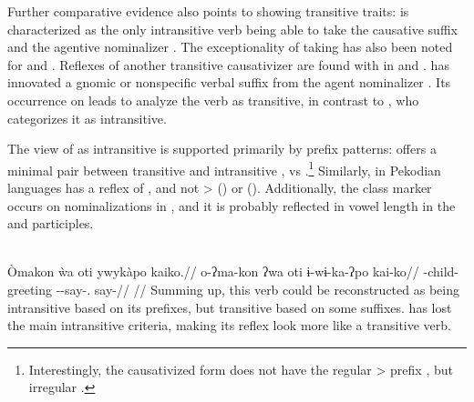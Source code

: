 Further comparative evidence also points to   showing transitive traits:
\trio {} is characterized as the only intransitive verb being able to take the causative suffix  and the agentive nominalizer  \parencite[263, 169]{triomeira1999}.
The exceptionality of   taking   has also been noted for \kalina \parencite[82]{courtz2008carib} and \wayana \parencite[258]{wayanatavares2005}.
Reflexes of another transitive causativizer  \parencite{gildea2015valency} are found with  in \apalai \parencite[51]{koehn1986apalai} and \waiwai \parencite[52]{waiwaihawkins1998}.
\panare has innovated a gnomic or nonspecific verbal suffix  from the agent nominalizer  \parencite[184]{gildea1998}.
Its occurrence on  leads \parencite[214]{panarepayne2013} to analyze the verb as transitive, in contrast to \textcite[102]{mattei1994diccionario}, who categorizes it as intransitive.

The view of  as intransitive is supported primarily by prefix patterns:
\kalina offers a minimal pair between transitive   and intransitive  ,   vs   \parencite[288, 45]{courtz2008carib}.\footnote{Interestingly, the \kalina causativized form   does not have the regular > prefix , but irregular  \parencite[430]{courtz2008carib}.}
Similarly,  in Pekodian languages has a reflex of   , and not >  (\bakairi) or  (\PXin).
Additionally, the  class marker  occurs on nominalizations in \kalina {}, and it is probably reflected in vowel length in the \trio \parencite[333]{triomeira1999} and \wayana \parencite[196]{wayanatavares2005} participles.

\kalina \parencite[][202]{courtz2008carib}\\
\begingl
\glpreamble Òmakon \`wa oti ywykàpo kaiko.//
\gla o-ʔma-kon ʔwa oti ɨ-wɨ-ka-ʔpo kai-ko//
\glb {}-child-  greeting --say-. say-//
\glft {}//
\endgl
\xe
%
Summing up, this verb could be reconstructed as being intransitive based on its prefixes, but transitive based on some suffixes.
\hixka has lost the main intransitive criteria, making its reflex look more like a transitive verb.

